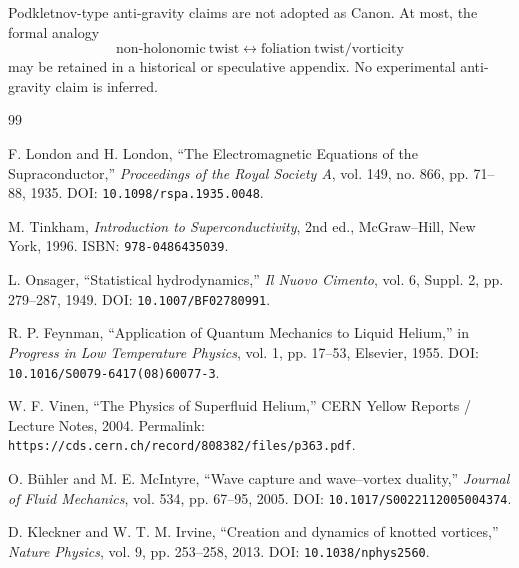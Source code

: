         Podkletnov-type anti-gravity claims are not adopted as Canon. At most, the
        formal analogy
        \[
            \mathrm{non\mbox{-}holonomic\ twist}
            \longleftrightarrow
            \mathrm{foliation\ twist/vorticity}
        \]
        may be retained in a historical or speculative appendix.
        No experimental anti-gravity claim is inferred.
        
        \begin{thebibliography}{99}
            
            F. London and H. London,
            ``The Electromagnetic Equations of the Supraconductor,''
            \textit{Proceedings of the Royal Society A},
            vol. 149, no. 866, pp. 71--88, 1935.
            DOI: \texttt{10.1098/rspa.1935.0048}.
            
            M. Tinkham,
            \textit{Introduction to Superconductivity},
            2nd ed.,
            McGraw--Hill, New York, 1996.
            ISBN: \texttt{978-0486435039}.
            
            L. Onsager,
            ``Statistical hydrodynamics,''
            \textit{Il Nuovo Cimento},
            vol. 6, Suppl. 2, pp. 279--287, 1949.
            DOI: \texttt{10.1007/BF02780991}.
            
            R. P. Feynman,
            ``Application of Quantum Mechanics to Liquid Helium,''
            in \textit{Progress in Low Temperature Physics},
            vol. 1, pp. 17--53, Elsevier, 1955.
            DOI: \texttt{10.1016/S0079-6417(08)60077-3}.
            
            W. F. Vinen,
            ``The Physics of Superfluid Helium,''
            CERN Yellow Reports / Lecture Notes, 2004.
            Permalink: \texttt{https://cds.cern.ch/record/808382/files/p363.pdf}.
            
            O. B{\"u}hler and M. E. McIntyre,
            ``Wave capture and wave--vortex duality,''
            \textit{Journal of Fluid Mechanics},
            vol. 534, pp. 67--95, 2005.
            DOI: \texttt{10.1017/S0022112005004374}.
            
            D. Kleckner and W. T. M. Irvine,
            ``Creation and dynamics of knotted vortices,''
            \textit{Nature Physics},
            vol. 9, pp. 253--258, 2013.
            DOI: \texttt{10.1038/nphys2560}.
            

\end{thebibliography}
